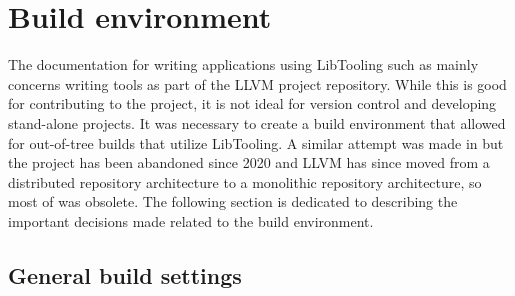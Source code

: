 \section{Build environment}

The documentation for writing applications using LibTooling such as \cite{MatchingClangAST, ClangTransformerTutorial} mainly concerns writing tools as part of the LLVM project repository. While this is good for contributing to the project, it is not ideal for version control and developing stand-alone projects.
It was necessary to create a build environment that allowed for out-of-tree builds that utilize LibTooling. A similar attempt was made in \cite{kasmisClangOutoftreeBuild2023} but the project has been abandoned since 2020 and LLVM has since moved from a distributed repository architecture to a monolithic repository architecture, so most of \cite{kasmisClangOutoftreeBuild2023} was obsolete.
The following section is dedicated to describing the important decisions made related to the build environment.

\subsection{General build settings}

